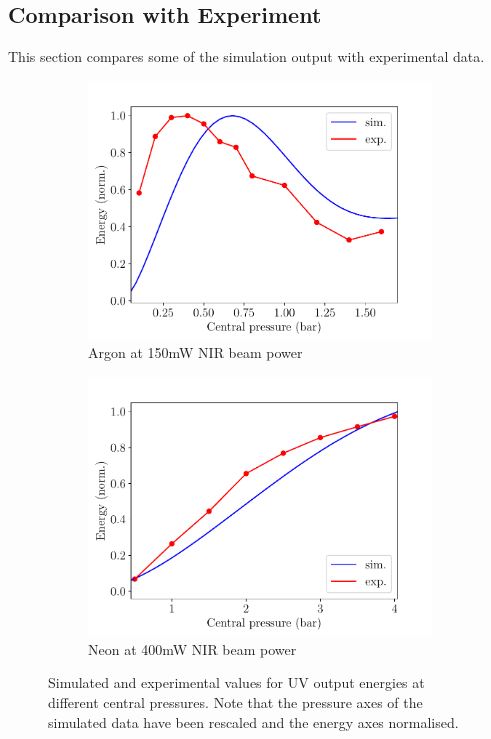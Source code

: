 \documentclass[a4paper]{jpconf}
\begin{document}
\subsection{Comparison with Experiment}
This section compares some of the simulation output with experimental data. \par 
\begin{figure}[h]
\centering
 \begin{subfigure}{0.5\textwidth}
\includegraphics[width=\textwidth]{im/energies_Ar}
\caption{Argon at 150mW NIR beam power}\label{im:sim_v_measured_Ar}
\end{subfigure}
 \begin{subfigure}{0.5\textwidth}
\includegraphics[width=\textwidth]{im/energies_Ne}
\caption{Neon at 400mW NIR beam power}\label{im:sim_v_measured_Ne}
\end{subfigure}
\caption{Simulated and experimental values for UV output energies at different central pressures. Note that the pressure axes of the simulated data have been rescaled and the energy axes normalised.}\label{im:sim_v_measured}
\end{figure}
\end{document}
